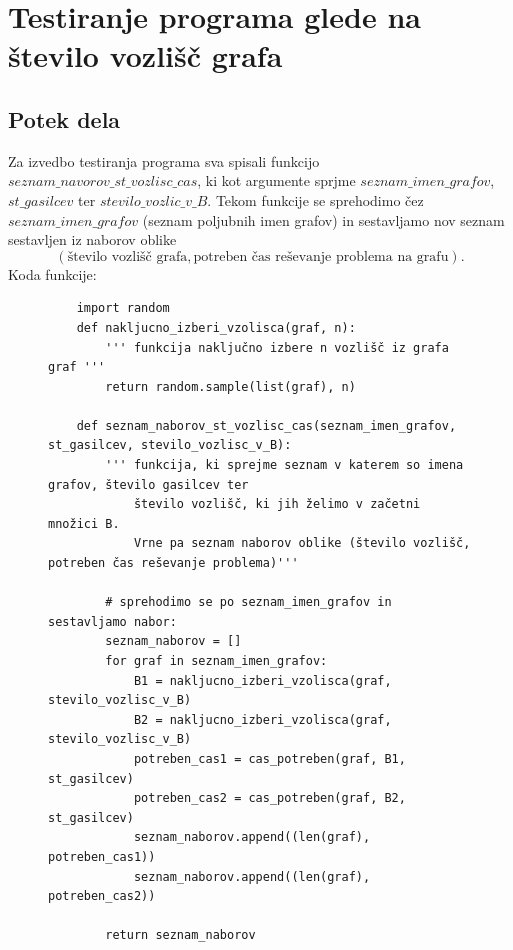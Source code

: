 \documentclass[a4paper, 12pt]{article}
\begin{document}
\pagebreak


\section{Testiranje programa glede na število vozlišč grafa}

\subsection{Potek dela}

Za izvedbo testiranja programa sva spisali funkcijo $seznam\_navorov\_st\_vozlisc\_cas$, ki
kot argumente sprjme $seznam\_imen\_grafov$, $st\_gasilcev$ ter $stevilo\_vozlic\_v\_B$. Tekom
funkcije se sprehodimo čez $seznam\_imen\_grafov$ (seznam poljubnih imen grafov) in sestavljamo 
nov seznam sestavljen iz naborov oblike  
$$\left( \text{število vozlišč grafa}, \text{potreben čas reševanje problema na grafu} \right).$$
Koda funkcije:

\begin{figure}[h]
\scriptsize
\begin{verbatim}
    import random
    def nakljucno_izberi_vzolisca(graf, n):
        ''' funkcija naključno izbere n vozlišč iz grafa graf '''
        return random.sample(list(graf), n)

    def seznam_naborov_st_vozlisc_cas(seznam_imen_grafov, st_gasilcev, stevilo_vozlisc_v_B):
        ''' funkcija, ki sprejme seznam v katerem so imena grafov, število gasilcev ter 
            število vozlišč, ki jih želimo v začetni množici B.
            Vrne pa seznam naborov oblike (število vozlišč, potreben čas reševanje problema)'''
        
        # sprehodimo se po seznam_imen_grafov in sestavljamo nabor:
        seznam_naborov = []
        for graf in seznam_imen_grafov:
            B1 = nakljucno_izberi_vzolisca(graf, stevilo_vozlisc_v_B)
            B2 = nakljucno_izberi_vzolisca(graf, stevilo_vozlisc_v_B)
            potreben_cas1 = cas_potreben(graf, B1, st_gasilcev)
            potreben_cas2 = cas_potreben(graf, B2, st_gasilcev)
            seznam_naborov.append((len(graf), potreben_cas1))
            seznam_naborov.append((len(graf), potreben_cas2))
        
        return seznam_naborov
\end{verbatim}
\end{figure}
\end{document}
